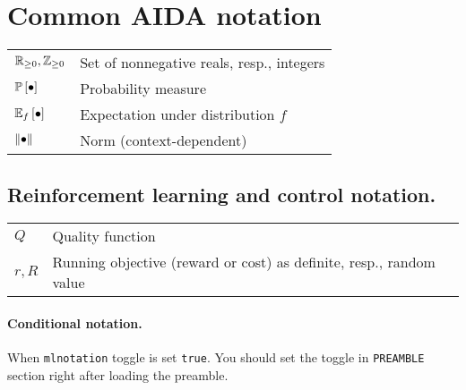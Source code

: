 \documentclass[12pt,twoside]{../../mitthesis}
\begin{document}
\section{Common AIDA notation}

\begin{tabularx}{0.97\textwidth}{ |p{}|p{}| }  
\hline
$\R_{\ge 0}, \Z_{\ge 0}$ & Set of nonnegative reals, resp., integers \\ 
$\PP{\bullet}$ & Probability measure \\
$\E[f]{\bullet}$ & Expectation under distribution $f$ \\
$\nrm{\bullet}$ & Norm (context-dependent) \\
\hline
\end{tabularx}

\subsection{Reinforcement learning and control notation.}

\begin{tabularx}{0.97\textwidth}{ |p{}|p{}| }  
\hline
$Q$ & Quality function \\ 
$r, R$ & Running objective (reward or cost) as definite, resp., random value\\
\hline
\end{tabularx}

\paragraph{Conditional notation.}

When \texttt{mlnotation} toggle is set \texttt{true}.
You should set the toggle in \texttt{PREAMBLE} section right after loading the preamble.
\end{document}
